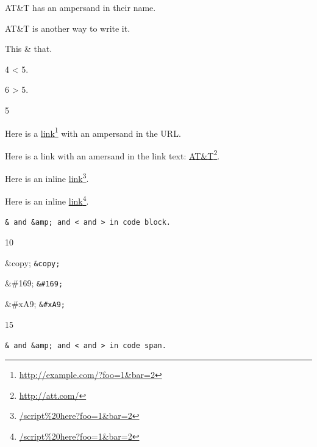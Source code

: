 
\def\mytitle{Amps and Angles}


AT\&T has an ampersand in their name.

AT\&T is another way to write it.

This \& that.

4 < 5.

6 > 5.

5

Here is a \href{http://example.com/?foo=1&amp;bar=2}{link}\footnote{\href{http://example.com/?foo=1&amp;bar=2}{http://example.com/?foo=1\&bar=2}} with an ampersand in the URL.

Here is a link with an amersand in the link text: \href{http://att.com/}{AT\&T}\footnote{\href{http://att.com/}{http://att.com/}}.

Here is an inline \href{/script%20here?foo=1&amp;bar=2}{link}\footnote{\href{/script%20here?foo=1&amp;bar=2}{/script\%20here?foo=1\&bar=2}}.

Here is an inline \href{/script%20here?foo=1&amp;bar=2}{link}\footnote{\href{/script%20here?foo=1&amp;bar=2}{/script\%20here?foo=1\&bar=2}}.

\begin{verbatim}
& and &amp; and < and > in code block.
\end{verbatim}

10

\&copy; \texttt{\&copy;}

\&\#169; \texttt{\&\#169;}

\&\#xA9; \texttt{\&\#xA9;}

15

\texttt{\& and \&amp; and < and > in code span.}



